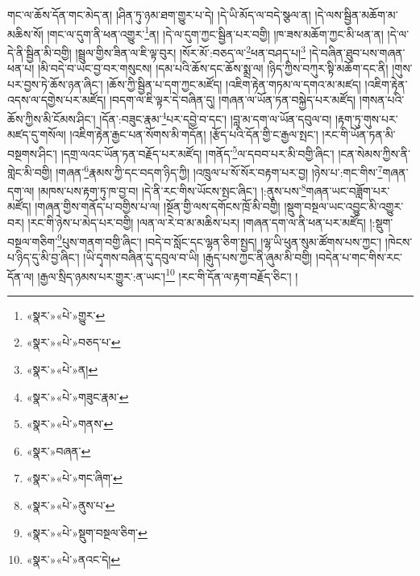གང་ལ་ཆོས་དོན་གང་མེད་ན། །ཤིན་ཏུ་ཉམ་ཐག་གྱུར་པ་དེ། །དེ་ཡི་མོད་ལ་བདེ་སྩལ་ན། །དེ་ལས་སྦྱིན་མཆོག་མ་མཆིས་སོ། །གང་ལ་དུག་ནི་ཕན་འགྱུར་\footnote{«སྣར་»«པེ་»གྱུར་}ན། །དེ་ལ་དུག་ཀྱང་སྦྱིན་པར་བགྱི། །ཁ་ཟས་མཆོག་ཀྱང་མི་ཕན་ན། །དེ་ལ་དེ་ནི་སྦྱིན་མི་བགྱི། །སྦྲུལ་གྱིས་ཟིན་ལ་ཇི་ལྟ་བུར། །སོར་མོ་:བཅད་ལ་\footnote{«སྣར་»«པེ་»བཅད་པ་}ཕན་བཤད་པ།\footnote{«སྣར་»«པེ་»ན།} །དེ་བཞིན་ཐུབ་པས་གཞན་ཕན་པ། །མི་བདེ་བ་ཡང་བྱ་བར་གསུངས། །དམ་པའི་ཆོས་དང་ཆོས་སྨྲ་ལ། །ཉིད་ཀྱིས་བཀུར་སྟི་མཆོག་དང་ནི། །གུས་པར་བྱས་ཏེ་ཆོས་ཉན་ཞིང་། །ཆོས་ཀྱི་སྦྱིན་པ་དག་ཀྱང་མཛོད། །འཇིག་རྟེན་གཏམ་ལ་དགའ་མ་མཛད། །འཇིག་རྟེན་འདས་ལ་དགྱེས་པར་མཛོད། །བདག་ལ་ཇི་ལྟར་དེ་བཞིན་དུ། །གཞན་ལ་ཡོན་ཏན་བསྐྱེད་པར་མཛོད། །གསན་པའི་ཆོས་ཀྱིས་མི་ངོམས་ཤིང་། །དོན་:བཟུང་རྣམ་\footnote{«སྣར་»«པེ་»གཟུང་རྣམ་}པར་དབྱེ་བ་དང་། །བླ་མ་དག་ལ་ཡོན་དབུལ་བ། །རྟག་ཏུ་གུས་པར་མཛད་དུ་གསོལ། །འཇིག་རྟེན་རྒྱང་པན་སོགས་མི་གདོན། །རྩོད་པའི་དོན་གྱི་ང་རྒྱལ་སྤང་། །རང་གི་ཡོན་ཏན་མི་བསྔགས་ཤིང་། །དགྲ་ལའང་ཡོན་ཏན་བརྗོད་པར་མཛོད། །གནོད་\footnote{«སྣར་»«པེ་»གནས་}ལ་དབབ་པར་མི་བགྱི་ཞིང་། །ངན་སེམས་ཀྱིས་ནི་གླེང་མི་བགྱི། །གཞན་\footnote{«སྣར་»བཞན་}རྣམས་ཀྱི་དང་བདག་ཉིད་ཀྱི། །འཁྲུལ་པ་སོ་སོར་བརྟག་པར་བྱ། །ཉེས་པ་:གང་གིས་\footnote{«སྣར་»«པེ་»གང་ཞིག་}གཞན་དག་ལ། །མཁས་པས་རྟག་ཏུ་ཁ་བྱ་བ། །དེ་ནི་རང་གིས་ཡོངས་སྤང་ཞིང་། །:ནུས་པས་\footnote{«སྣར་»«པེ་»ནུས་པ་}གཞན་ཡང་བཟློག་པར་མཛོད། །གཞན་གྱིས་གནོད་པ་བགྱིས་པ་ལ། །སྔོན་གྱི་ལས་དགོངས་ཁྲོ་མི་བགྱི། །སྡུག་བསྔལ་ཡང་འབྱུང་མི་འགྱུར་བར། །རང་གི་ཉེས་པ་མེད་པར་བགྱི། །ལན་ལ་རེ་བ་མ་མཆིས་པར། །གཞན་དག་ལ་ནི་ཕན་པར་མཛོད། །:སྡུག་བསྔལ་གཅིག་\footnote{«སྣར་»«པེ་»སྡུག་བསྔལ་ཅིག་}པུས་གནག་བགྱི་ཞིང་། །བདེ་བ་སློང་དང་ལྷན་ཅིག་སྤྱད། །ལྷ་ཡི་ཕུན་སུམ་ཚོགས་པས་ཀྱང་། །ཁེངས་པ་ཉིད་དུ་མི་བྱ་ཞིང་། །ཡི་དྭགས་བཞིན་དུ་དབུལ་བ་ཡི། །རྒུད་པས་ཀྱང་ནི་ཞུམ་མི་བགྱི། །བདེན་པ་གང་གིས་རང་དོན་ལ། །རྒྱལ་སྲིད་ཉམས་པར་གྱུར་:ན་ཡང་།\footnote{«སྣར་»«པེ་»ནའང་དེ།} །རང་གི་དོན་ལ་རྟག་བརྗོད་ཅིང་། །
